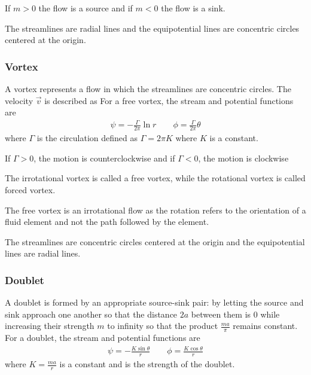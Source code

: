 \documentclass[10pt, twocolumn]{article}
\begin{document}
If \(m > 0\) the flow is a source and if \(m < 0\) the flow is a sink.

\begin{remark}
  The streamlines are radial lines and the equipotential lines are concentric circles centered at the origin.
\end{remark}


\subsubsection{Vortex}
A vortex represents a flow in which the streamlines are concentric circles.
The velocity \(\vec{v}\) is described as
For a free vortex, the stream and potential functions are
\begin{align}
  \psi = - \frac{\Gamma}{2\pi} \ln r
  \qquad \phi = \frac{\Gamma}{2\pi} \theta
\end{align}
where \(\Gamma\) is the circulation defined as \(\Gamma = 2\pi K\) where \(K\) is a constant.

If \(\Gamma > 0\), the motion is counterclockwise and if \(\Gamma < 0\), the motion is clockwise

The irrotational vortex is called a free vortex, while the rotational vortex is called forced vortex.

\begin{remark}
  The free vortex is an irrotational flow as the rotation refers to the orientation of a fluid element and not the path followed by the element.
\end{remark}

\begin{remark}
  The streamlines are concentric circles centered at the origin and the equipotential lines are radial lines.
\end{remark}


\subsubsection{Doublet}
A doublet is formed by an appropriate source-sink pair: by letting the source and sink approach one another so that the distance \(2a\) between them is 0 while increasing their strength \(m\) to infinity so that the product \(\frac{ma}{\pi}\) remains constant.
For a doublet, the stream and potential functions are
\begin{align}
  \psi = - \frac{K \sin\theta}{r}
  \qquad \phi = \frac{K \cos\theta}{r}
\end{align}
where \(K = \frac{ma}{r}\) is a constant and is the strength of the doublet.
\end{document}
